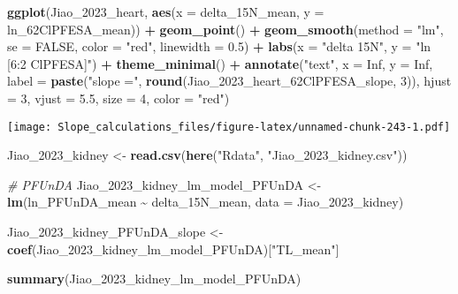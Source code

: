 \documentclass[
]{article}
\newenvironment{Shaded}{\begin{snugshade}}{\end{snugshade}}
\newcommand{\AttributeTok}[1]{\textcolor[rgb]{0.13,0.29,0.53}{#1}}
\newcommand{\CommentTok}[1]{\textcolor[rgb]{0.56,0.35,0.01}{\textit{#1}}}
\newcommand{\ConstantTok}[1]{\textcolor[rgb]{0.56,0.35,0.01}{#1}}
\newcommand{\DecValTok}[1]{\textcolor[rgb]{0.00,0.00,0.81}{#1}}
\newcommand{\FloatTok}[1]{\textcolor[rgb]{0.00,0.00,0.81}{#1}}
\newcommand{\FunctionTok}[1]{\textcolor[rgb]{0.13,0.29,0.53}{\textbf{#1}}}
\newcommand{\NormalTok}[1]{#1}
\newcommand{\OtherTok}[1]{\textcolor[rgb]{0.56,0.35,0.01}{#1}}
\newcommand{\SpecialCharTok}[1]{\textcolor[rgb]{0.81,0.36,0.00}{\textbf{#1}}}
\newcommand{\StringTok}[1]{\textcolor[rgb]{0.31,0.60,0.02}{#1}}
\begin{document}
\begin{Shaded}
\begin{Highlighting}[]
\FunctionTok{ggplot}\NormalTok{(Jiao\_2023\_heart, }\FunctionTok{aes}\NormalTok{(}\AttributeTok{x =}\NormalTok{ delta\_15N\_mean, }\AttributeTok{y =}\NormalTok{ ln\_62ClPFESA\_mean)) }\SpecialCharTok{+}
  \FunctionTok{geom\_point}\NormalTok{() }\SpecialCharTok{+}
  \FunctionTok{geom\_smooth}\NormalTok{(}\AttributeTok{method =} \StringTok{"lm"}\NormalTok{, }\AttributeTok{se =} \ConstantTok{FALSE}\NormalTok{, }\AttributeTok{color =} \StringTok{"red"}\NormalTok{, }\AttributeTok{linewidth =} \FloatTok{0.5}\NormalTok{) }\SpecialCharTok{+}
  \FunctionTok{labs}\NormalTok{(}\AttributeTok{x =} \StringTok{"delta 15N"}\NormalTok{,}
       \AttributeTok{y =} \StringTok{"ln [6:2 ClPFESA]"}\NormalTok{) }\SpecialCharTok{+}
  \FunctionTok{theme\_minimal}\NormalTok{() }\SpecialCharTok{+}
  \FunctionTok{annotate}\NormalTok{(}\StringTok{"text"}\NormalTok{, }\AttributeTok{x =} \ConstantTok{Inf}\NormalTok{, }\AttributeTok{y =} \ConstantTok{Inf}\NormalTok{, }\AttributeTok{label =} \FunctionTok{paste}\NormalTok{(}\StringTok{"slope ="}\NormalTok{, }\FunctionTok{round}\NormalTok{(Jiao\_2023\_heart\_62ClPFESA\_slope, }\DecValTok{3}\NormalTok{)), }
           \AttributeTok{hjust =} \DecValTok{3}\NormalTok{, }\AttributeTok{vjust =} \FloatTok{5.5}\NormalTok{, }\AttributeTok{size =} \DecValTok{4}\NormalTok{, }\AttributeTok{color =} \StringTok{"red"}\NormalTok{)}
\end{Highlighting}
\end{Shaded}

\texttt{[image: Slope\_calculations\_files/figure-latex/unnamed-chunk-243-1.pdf]}

\begin{Shaded}
\begin{Highlighting}[]
\NormalTok{Jiao\_2023\_kidney }\OtherTok{\textless{}{-}} \FunctionTok{read.csv}\NormalTok{(}\FunctionTok{here}\NormalTok{(}\StringTok{"Rdata"}\NormalTok{, }\StringTok{"Jiao\_2023\_kidney.csv"}\NormalTok{))}

\CommentTok{\# PFUnDA}
\NormalTok{Jiao\_2023\_kidney\_lm\_model\_PFUnDA }\OtherTok{\textless{}{-}} \FunctionTok{lm}\NormalTok{(ln\_PFUnDA\_mean }\SpecialCharTok{\textasciitilde{}}\NormalTok{ delta\_15N\_mean,}
                                    \AttributeTok{data =}\NormalTok{ Jiao\_2023\_kidney)}

\NormalTok{Jiao\_2023\_kidney\_PFUnDA\_slope }\OtherTok{\textless{}{-}} \FunctionTok{coef}\NormalTok{(Jiao\_2023\_kidney\_lm\_model\_PFUnDA)[}\StringTok{"TL\_mean"}\NormalTok{]}

\FunctionTok{summary}\NormalTok{(Jiao\_2023\_kidney\_lm\_model\_PFUnDA)}
\end{Highlighting}
\end{Shaded}
\end{document}
